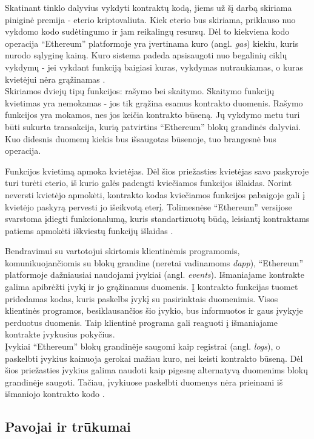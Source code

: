 Skatinant tinklo dalyvius vykdyti kontraktų kodą, jiems už šį darbą skiriama piniginė premija - eterio kriptovaliuta. Kiek eterio
bus skiriama, priklauso nuo vykdomo kodo sudėtingumo ir jam reikalingų resursų. Dėl to kiekviena kodo operacija \enquote{Ethereum} platformoje
yra įvertinama kuro (angl. \textit{gas}) kiekiu, kuris nurodo sąlyginę kainą. Kuro sistema padeda apsisaugoti nuo begalinių ciklų vykdymų - jei vykdant
funkciją baigiasi kuras, vykdymas nutraukiamas, o kuras kvietėjui nėra grąžinamas \cite{EthereumWhitePaper}.\\
Skiriamos dviejų tipų funkcijos: rašymo bei skaitymo. Skaitymo funkcijų kvietimas yra nemokamas - jos tik grąžina
esamus kontrakto duomenis. Rašymo funkcijos yra mokamos, nes jos keičia kontrakto būseną. Jų vykdymo metu turi būti sukurta transakcija,
kurią patvirtins \enquote{Ethereum} blokų grandinės dalyviai. Kuo didesnis duomenų kiekis bus išsaugotas būsenoje, tuo brangesnė bus operacija.

Funkcijos kvietimą apmoka kvietėjas. Dėl šios priežasties kvietėjas savo paskyroje turi turėti eterio, iš kurio galės padengti
kviečiamos funkcijos išlaidas. Norint neversti kvietėjo apmokėti, kontrakto kodas kviečiamos funkcijos pabaigoje gali į kvietėjo paskyrą
pervesti jo išeikvotą eterį. Tolimesnėse \enquote{Ethereum} versijose svarstoma įdiegti funkcionalumą,
kuris standartizuotų būdą, leisiantį kontraktams patiems apmokėti iškviestų funkcijų išlaidas \cite{ContractPays}.

Bendravimui su vartotojui skirtomis klientinėmis programomis, komunikuojančiomis su blokų grandine (neretai vadinamoms \textit{dapp}), \enquote{Ethereum} platformoje dažniausiai naudojami
įvykiai (angl. \textit{events}). Išmaniajame kontrakte galima apibrėžti įvykį ir jo grąžinamus duomenis. Į kontrakto funkcijas tuomet
pridedamas kodas, kuris paskelbs įvykį su pasirinktais duomenimis. Visos klientinės programos,
besiklausančios šio įvykio, bus informuotos ir gaus įvykyje perduotus duomenis. Taip klientinė programa gali reaguoti į išmaniajame
kontrakte įvykusius pokyčius.\\
Įvykiai \enquote{Ethereum} blokų grandinėje saugomi kaip registrai (angl. \textit{logs}), o paskelbti įvykius kainuoja gerokai mažiau kuro,
nei keisti kontrakto būseną. Dėl šios priežasties įvykius galima naudoti kaip pigesnę alternatyvą duomenims blokų grandinėje saugoti. Tačiau, įvykiuose paskelbti
duomenys nėra prieinami iš išmaniojo kontrakto kodo \cite{EthereumWhitePaper}.

\subsection{Pavojai ir trūkumai} \label{blockchain:concerns}

